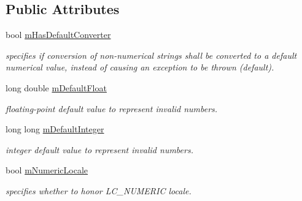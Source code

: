 \subsection*{Public Attributes}
\begin{DoxyCompactItemize}
\item 
\mbox{\label{structrapidcsv_1_1ConverterParams_acc9b157c2646d342e42467813e5972d3}} 
bool \hyperlink{structrapidcsv_1_1ConverterParams_acc9b157c2646d342e42467813e5972d3}{m\+Has\+Default\+Converter}
\begin{DoxyCompactList}\small\item\em specifies if conversion of non-\/numerical strings shall be converted to a default numerical value, instead of causing an exception to be thrown (default). \end{DoxyCompactList}\item 
\mbox{\label{structrapidcsv_1_1ConverterParams_a1d1362d122cc65b288fb9d85c5a209b6}} 
long double \hyperlink{structrapidcsv_1_1ConverterParams_a1d1362d122cc65b288fb9d85c5a209b6}{m\+Default\+Float}
\begin{DoxyCompactList}\small\item\em floating-\/point default value to represent invalid numbers. \end{DoxyCompactList}\item 
\mbox{\label{structrapidcsv_1_1ConverterParams_aaba94d37670fb1d637d40113400b34d9}} 
long long \hyperlink{structrapidcsv_1_1ConverterParams_aaba94d37670fb1d637d40113400b34d9}{m\+Default\+Integer}
\begin{DoxyCompactList}\small\item\em integer default value to represent invalid numbers. \end{DoxyCompactList}\item 
\mbox{\label{structrapidcsv_1_1ConverterParams_af8860c14e6e5e9eab8595ec2dd8a7bfa}} 
bool \hyperlink{structrapidcsv_1_1ConverterParams_af8860c14e6e5e9eab8595ec2dd8a7bfa}{m\+Numeric\+Locale}
\begin{DoxyCompactList}\small\item\em specifies whether to honor L\+C\+\_\+\+N\+U\+M\+E\+R\+IC locale. \end{DoxyCompactList}\end{DoxyCompactItemize}


